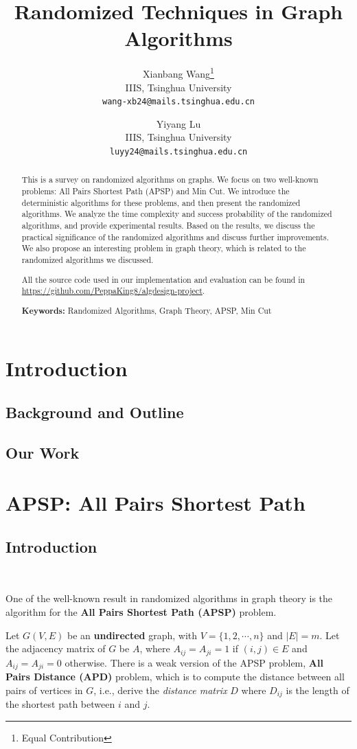 \documentclass[12pt]{article}
\title{Randomized Techniques in Graph Algorithms}
\author{
    Xianbang Wang\thanks{Equal Contribution} \\
    \fontsize{13}{12}\selectfont
    IIIS, Tsinghua University \\
    \fontsize{13}{12}\selectfont
    \texttt{wang-xb24@mails.tsinghua.edu.cn}
    \and
    Yiyang Lu\footnotemark[1] \\
    \fontsize{13}{12}\selectfont
    IIIS, Tsinghua University \\
    \fontsize{13}{12}\selectfont
    \texttt{luyy24@mails.tsinghua.edu.cn}
}
\date{}
\theoremstyle{plain}
\begin{document}
\maketitle
\begin{abstract}
    This is a survey on randomized algorithms on graphs. We focus on two well-known problems: All Pairs Shortest Path (APSP) and Min Cut. We introduce the deterministic algorithms for these problems, and then present the randomized algorithms. We analyze the time complexity and success probability of the randomized algorithms, and provide experimental results. Based on the results, we discuss the practical significance of the randomized algorithms and discuss further improvements. We also propose an interesting problem in graph theory, which is related to the randomized algorithms we discussed.
    
    All the source code used in our implementation and evaluation can be found in \url{https://github.com/PeppaKing8/algdesign-project}.

    \textbf{Keywords:} Randomized Algorithms, Graph Theory, APSP, Min Cut
\end{abstract}

\tableofcontents


\section{Introduction}
\subsection{Background and Outline}
\subsection{Our Work}

\section{APSP: All Pairs Shortest Path}
\subsection{Introduction}\

One of the well-known result in randomized algorithms in graph theory is the algorithm for the \textbf{All Pairs Shortest Path (APSP)} problem.

Let $G(V,E)$ be an \textbf{undirected} graph, with $V=\{1,2,\cdots,n\}$ and $|E|=m$. Let the adjacency matrix of $G$ be $A$, where $A_{ij}=A_{ji}=1$ if $(i,j)\in E$ and $A_{ij}=A_{ji}=0$ otherwise. There is a weak version of the APSP problem, \textbf{All Pairs Distance (APD)} problem, which is to compute the distance between all pairs of vertices in $G$, i.e., derive the \emph{distance matrix} $D$ where $D_{ij}$ is the length of the shortest path between $i$ and $j$.
\end{document}
